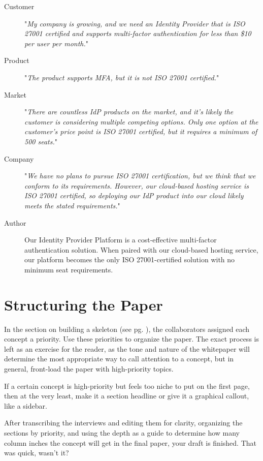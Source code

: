 \documentclass[letterpaper]{article}
\begin{document}
\begin{description}
    \item[Customer] "\textit{My company is growing, and we need an Identity Provider that is ISO 27001 certified and supports multi-factor authentication for less than \$10 per user per month.}"
    \item[Product] "\textit{The product supports MFA, but it is not ISO 27001 certified.}"
    \item[Market] "\textit{There are countless IdP products on the market, and it's likely the customer is considering multiple competing options. Only one option at the customer's price point is ISO 27001 certified, but it requires a minimum of 500 seats.}"
    \item[Company] "\textit{We have no plans to pursue ISO 27001 certification, but we think that we conform to its requirements. However, our cloud-based hosting service is ISO 27001 certified, so deploying our IdP product into our cloud likely meets the stated requirements.}"
    \item[Author] Our Identity Provider Platform is a cost-effective multi-factor authentication solution. When paired with our cloud-based hosting service, our platform becomes the only ISO 27001-certified solution with no minimum seat requirements.
\end{description}


\section{Structuring the Paper}
In the section on building a skeleton (see pg. \pageref{topic:skeleton}), the collaborators assigned each concept a priority. Use these priorities to organize the paper. The exact process is left as an exercise for the reader, as the tone and nature of the whitepaper will determine the most appropriate way to call attention to a concept, but in general, front-load the paper with high-priority topics. 

If a certain concept is high-priority but feels too niche to put on the first page, then at the very least, make it a section headline or give it a graphical callout, like a sidebar.

After transcribing the interviews and editing them for clarity, organizing the sections by priority, and using the depth as a guide to determine how many column inches the concept will get in the final paper, your draft is finished. That was quick, wasn't it? 

\cleardoublepage
{}
\end{document}
